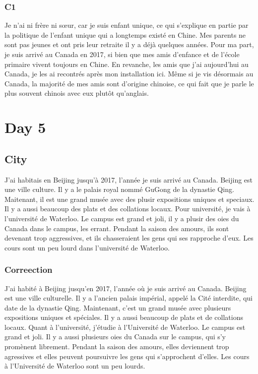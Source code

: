 \documentclass{book}
\begin{document}
    \subsection{C1}
        Je n'ai ni frère ni sœur, car je suis enfant unique, ce qui s'explique en partie par la politique de l'enfant unique qui a longtemps existé en Chine.
        Mes parents ne sont pas jeunes et ont pris leur retraite il y a déjà quelques années.
        Pour ma part, je suis arrivé au Canada en 2017, si bien que mes amis d'enfance et de l'école primaire vivent toujours en Chine.
        En revanche, les amis que j'ai aujourd'hui au Canada, je les ai recontrés après mon installation ici.
        Même si je vis désormais au Canada, la majorité de mes amis sont d'origine chinoise, ce qui fait que je parle le plus souvent chinois avec eux plutôt qu'anglais.
        
\chapter{Day 5}
    \section{City}
        J'ai habitais en Beijing jusqu'à 2017, l'année je suis arrivé au Canada.
        Beijing est une ville culture. Il y a le palais royal nommé GuGong de la dynastie Qing.
        Maitenant, il est une grand musée avec des plusir expositions uniques et speciaux. 
        Il y a aussi beaucoup des plats et des collations locaux.
        Pour université, je vais à l'université de Waterloo. 
        Le campus est grand et joli, il y a plusir des oies du Canada dans le campus, les errant. 
        Pendant la saison des amours, ils sont devenant trop aggressives, et ils chasseraient les gens qui ses rapproche d'eux.
        Les cours sont un peu lourd dans l'université de Waterloo.

    \subsection{Correection}
        J'ai habité à Beijing jusqu'en 2017, l'année où je suis arrivé au Canada. 
        Beijing est une ville culturelle. Il y a l'ancien palais impérial, appelé la Cité interdite, qui date de la dynastie Qing.
        Maintenant, c'est un grand musée avec plusieurs expositions uniques et spéciales. Il y a aussi beaucoup de plats et de collations locaux.
        Quant à l'université, j'étudie à l'Université de Waterloo. Le campus est grand et joli.
        Il y a aussi plusieurs oies du Canada sur le campus, qui s'y promènent librement. 
        Pendant la saison des amours, elles deviennent trop agressives et elles peuvent poursuivre les gens qui s'approchent d'elles.
        Les cours à l'Université de Waterloo sont un peu lourds.
\end{document}
